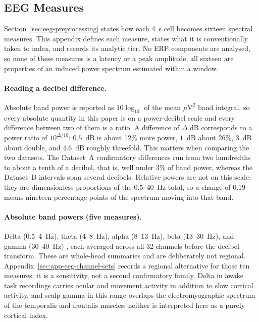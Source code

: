 \documentclass[english]{article}
\begin{document}
\subsection{EEG Measures}
\label{sec:app-eeg-measures}

Section~\ref{sec:eeg-preprocessing} states how each 4~s cell becomes sixteen spectral measures. This appendix defines each measure, states what it is conventionally taken to index, and records its analytic tier. No ERP components are analysed, so none of these measures is a latency or a peak amplitude; all sixteen are properties of an induced power spectrum estimated within a window.

\paragraph{Reading a decibel difference.}
Absolute band power is reported as \(10\log_{10}\) of the mean \(\mu\mathrm{V}^{2}\) band integral, so every absolute quantity in this paper is on a power-decibel scale and every difference between two of them is a ratio. A difference of \(\Delta\) dB corresponds to a power ratio of \(10^{\Delta/10}\): \(0.5\)~dB is about 12\% more power, \(1\)~dB about 26\%, \(3\)~dB about double, and \(4.6\)~dB roughly threefold. This matters when comparing the two datasets. The Dataset~A confirmatory differences run from two hundredths to about a tenth of a decibel, that is, well under 3\% of band power, whereas the Dataset~B intervals span several decibels. Relative powers are not on this scale: they are dimensionless proportions of the 0.5--40~Hz total, so a change of \(0.19\) means nineteen percentage points of the spectrum moving into that band.

\paragraph{Absolute band powers (five measures).}
Delta (0.5--4~Hz), theta (4--8~Hz), alpha (8--13~Hz), beta (13--30~Hz), and gamma (30--40~Hz) \cite{cochran1967fast,zheng2015investigating}, each averaged across all 32 channels before the decibel transform. These are whole-head summaries and are deliberately not regional. Appendix~\ref{sec:app-eeg-channel-sets} records a regional alternative for those ten measures; it is a sensitivity, not a second confirmatory family. Delta in awake task recordings carries ocular and movement activity in addition to slow cortical activity, and scalp gamma in this range overlaps the electromyographic spectrum of the temporalis and frontalis muscles; neither is interpreted here as a purely cortical index.
\end{document}
